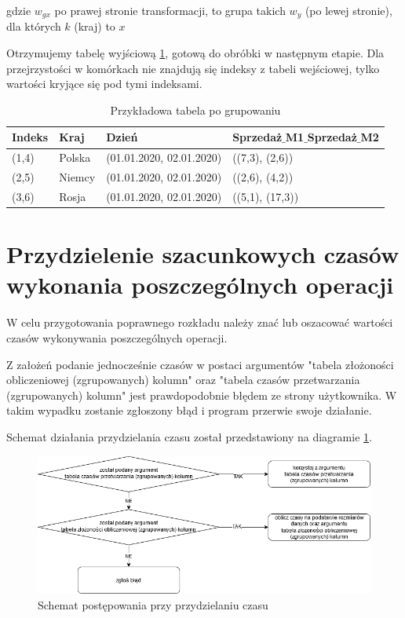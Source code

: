 \documentclass[brudnopis]{xmgr}
\begin{document}
gdzie $w_{gx}$ po prawej stronie transformacji, to grupa takich $w_y$ (po lewej stronie), dla których $k$ (kraj) to $x$
\medskip

Otrzymujemy tabelę wyjściową \ref{tab:example-output}, gotową do obróbki w następnym etapie.
Dla przejrzystości w komórkach nie znajdują się indeksy z tabeli wejściowej, tylko wartości kryjące się pod tymi indeksami.

\begin{table}[!tbh]
\begin{tabular}{|l|l|l|l|} \hline
Indeks & Kraj & Dzień & Sprzedaż$\_$M1$\_$Sprzedaż$\_$M2 \\ \hline
(1,4) & Polska & (01.01.2020, 02.01.2020) & ((7,3), (2,6)) \\ \hline
(2,5) & Niemcy & (01.01.2020, 02.01.2020) & ((2,6), (4,2)) \\ \hline
(3,6) & Rosja & (01.01.2020, 02.01.2020) & ((5,1), (17,3)) \\ \hline
\end{tabular}
\caption{Przykładowa tabela po grupowaniu\label{tab:example-output}}
\end{table}

\newpage

\section{Przydzielenie szacunkowych czasów wykonania poszczególnych operacji}

W celu przygotowania poprawnego rozkładu należy znać lub oszacować wartości czasów wykonywania poszczególnych operacji.\medskip

Z założeń podanie jednocześnie czasów w postaci argumentów "tabela złożoności obliczeniowej (zgrupowanych) kolumn" oraz "tabela czasów przetwarzania (zgrupowanych) kolumn" jest prawdopodobnie błędem ze strony użytkownika. W takim wypadku zostanie zgłoszony błąd i program przerwie swoje działanie.\medskip

Schemat działania przydzielania czasu został przedstawiony na diagramie \ref{diag:time-assign}.

\begin{figure}[!tbh]
\centering
\includegraphics[width=.8\hsize]{fig/przydzielanie_czasow.png}
\caption{Schemat postępowania przy przydzielaniu czasu\label{diag:time-assign}}
\end{figure}
\medskip
\end{document}
